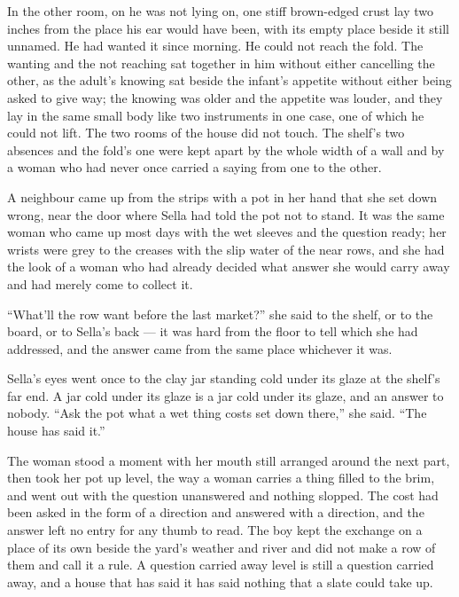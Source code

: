 In the other room, on  he was not lying on, one stiff brown-edged crust lay two inches from the place his ear would have been, with its empty place beside it still unnamed. He had wanted it since morning. He could not reach the fold. The wanting and the not reaching sat together in him without either cancelling the other, as the adult's knowing sat beside the infant's appetite without either being asked to give way; the knowing was older and the appetite was louder, and they lay in the same small body like two instruments in one case, one of which he could not lift. The two rooms of the house did not touch. The shelf's two absences and the fold's one were kept apart by the whole width of a wall and by a woman who had never once carried a saying from one to the other.

A neighbour came up from the strips with a pot in her hand that she set down wrong, near the door where Sella had told the pot not to stand. It was the same woman who came up most days with the wet sleeves and the question ready; her wrists were grey to the creases with the slip water of the near rows, and she had the look of a woman who had already decided what answer she would carry away and had merely come to collect it.

“What'll the row want before the last market?” she said to the shelf, or to the board, or to Sella's back --- it was hard from the floor to tell which she had addressed, and the answer came from the same place whichever it was.

Sella's eyes went once to the clay jar standing cold under its glaze at the shelf's far end. A jar cold under its glaze is a jar cold under its glaze, and an answer to nobody. “Ask the pot what a wet thing costs set down there,” she said. “The house has said it.”

The woman stood a moment with her mouth still arranged around the next part, then took her pot up level, the way a woman carries a thing filled to the brim, and went out with the question unanswered and nothing slopped. The cost had been asked in the form of a direction and answered with a direction, and the answer left no entry for any thumb to read. The boy kept the exchange on a place of its own beside the yard's weather and river and did not make a row of them and call it a rule. A question carried away level is still a question carried away, and a house that has said it has said nothing that a slate could take up.

\scenebreak

